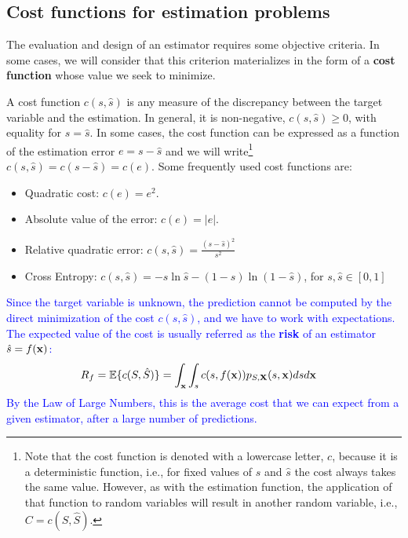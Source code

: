 \subsection{Cost functions for estimation problems}
\label{subsec_funcion_coste}

The evaluation and design of an estimator requires some objective criteria. In some cases, we will consider that this criterion materializes in the form of a {\bf cost function} whose value we seek to minimize. %

A cost function $c(s,\hat s)$ is any measure of the discrepancy between the target variable and the estimation. In general, it is non-negative, $c(s,\hat s) \geq 0$, with equality for $s = \hat s$. In some cases, the cost function can be expressed as a function of the estimation error $e= s-\hat s$ and we will write\footnote{Note that the cost function is denoted with a lowercase letter, $c$, because it is a deterministic function, i.e., for fixed values of $s$ and $\hat s$ the cost always takes the same value. However, as with the estimation function, the application of that function to random variables will result in another random variable, i.e., $C = c(S,\hat S)$.} $c(s,\hat s) = c(s - \hat s) = c(e)$. Some frequently used cost functions are:
\begin{itemize}
\item Quadratic cost: $c(e) = e^2$.
\item Absolute value of the error: $c(e) = |e|$.
\item Relative quadratic error: $c(s,\hat s) = \frac{(s-\hat{s})^2}{s^2}$
\item Cross Entropy: $c(s,\hat s) = - s \ln \hat s - (1-s) \ln (1-\hat s)$, for $s,\hat{s}\in [0,1]$
\end{itemize}

\textcolor{blue}{Since the target variable is unknown, the prediction cannot be computed by the direct minimization of the cost $c(s, \hat s)$, and we have to work with expectations. The expected value of the cost is usually referred as the {\bf risk} of an estimator $\hat{s}=f({\bf x})$:
\begin{align}
\label{Est:coste_medio_gen}
R_f = \mathbb{E}\{c(S,\hat S)\} 
    & = \int_{\bf x} \int_s c(s,f({\bf x})) p_{S,{\bf X}}(s,{\bf x}) ds d{\bf x}
\end{align}
By the Law of Large Numbers, this is the average cost that we can expect from a given estimator, after a large number of predictions.}

